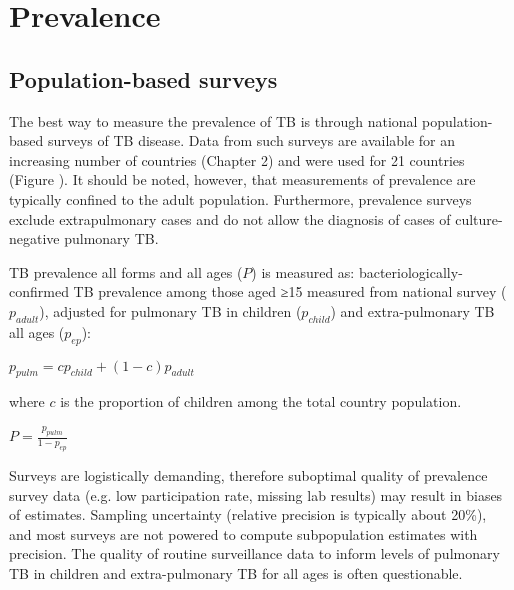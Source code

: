 \section{Prevalence}

\subsection{Population-based surveys}
The best way to measure the prevalence of TB is through national population-based surveys of TB disease\cite{18713496}\cite{WHO2011}. Data from such surveys are available for an increasing number of countries (Chapter 2) and were used for 21 countries (Figure ). It should be noted, however, that measurements of prevalence are typically confined to the adult population. Furthermore, prevalence surveys exclude extrapulmonary cases and do not allow the diagnosis of cases of culture-negative pulmonary TB. 

TB prevalence all forms and all ages ($P$) is measured as: bacteriologically-confirmed TB prevalence among those aged ≥15 measured from national survey ($p_{adult}$), adjusted for pulmonary TB in children ($p_{child}$) and extra-pulmonary TB all ages ($p_{ep}$):

$p_{pulm} = c p_{child} + (1 − c) p_{adult}$

where $c$ is the proportion of children among the total country population.

$P = \frac{p_{pulm}}{1 - p_{ep}}$

Surveys are logistically demanding, therefore suboptimal quality of prevalence survey data (e.g. low participation rate, missing lab results) may result in biases of estimates. Sampling uncertainty (relative precision is typically about 20\%), and most surveys are not powered to compute subpopulation estimates with precision. The  quality of routine surveillance data to inform levels of pulmonary TB in children and extra-pulmonary TB for all ages is often questionable.



 
